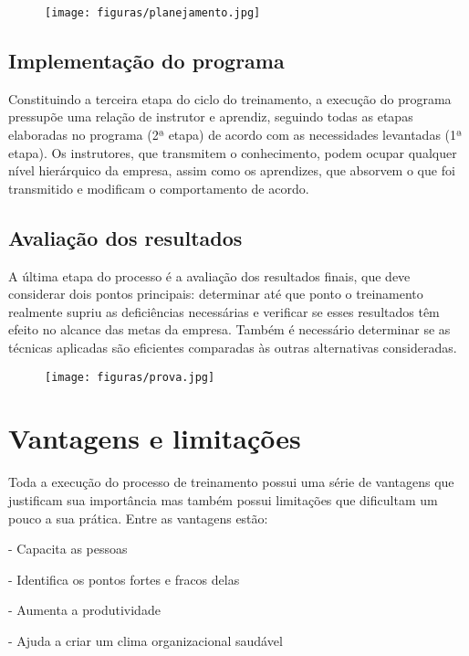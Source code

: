 \begin{figure}[h]

\centering
\texttt{[image: figuras/planejamento.jpg]}
\end{figure}


\subsection{Implementação do programa}
Constituindo a terceira etapa do ciclo do treinamento, a execução do programa pressupõe uma relação de instrutor e aprendiz, seguindo todas as etapas elaboradas no programa (2ª etapa) de acordo com as necessidades levantadas (1ª etapa). Os instrutores, que transmitem o conhecimento, podem ocupar qualquer nível hierárquico da empresa, assim como os aprendizes, que absorvem o que foi transmitido e modificam o comportamento de acordo.



\subsection{Avaliação dos resultados}
A última etapa do processo é a avaliação dos resultados finais, que deve considerar dois pontos principais: determinar até que ponto o treinamento realmente supriu as deficiências necessárias e verificar se esses resultados têm efeito no alcance das metas da empresa. Também é necessário determinar se as técnicas aplicadas são eficientes comparadas às outras alternativas consideradas.

\begin{figure}[h]

\centering
\texttt{[image: figuras/prova.jpg]}
\end{figure}

\section{Vantagens e limitações}
Toda a execução do processo de treinamento possui uma série de vantagens que justificam sua importância mas também possui limitações que dificultam um pouco a sua prática. 
Entre as vantagens estão:

- Capacita as pessoas

- Identifica os pontos fortes e fracos delas

- Aumenta a produtividade

- Ajuda a criar um clima organizacional saudável


